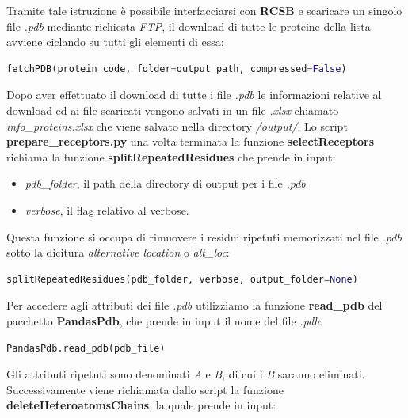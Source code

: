 Tramite tale istruzione è possibile interfacciarsi con \textbf{RCSB} e scaricare un singolo file \textit{.pdb} mediante richiesta \textit{FTP}, il download di tutte le proteine della lista avviene ciclando su tutti gli elementi di essa:

\begin{lstlisting}[language=Python, label=lst:code18, caption={funzione fetchPDB}]
fetchPDB(protein_code, folder=output_path, compressed=False)
\end{lstlisting}

Dopo aver effettuato il download di tutte i file \textit{.pdb} le informazioni relative al download ed ai file scaricati vengono salvati in un file \textit{.xlsx} chiamato \textit{info\_proteins.xlsx} che viene salvato nella directory \textit{/output/}.\newline
Lo script \textbf{prepare\_receptors.py} una volta terminata la funzione \textbf{selectReceptors} richiama la funzione \textbf{splitRepeatedResidues} che prende in input:

\begin{itemize}
    \item \textit{pdb\_folder}, il path della directory di output per i file \textit{.pdb}
    \item \textit{verbose}, il flag relativo al verbose.
\end{itemize}

Questa funzione si occupa di rimuovere i residui ripetuti memorizzati nel file \textit{.pdb} sotto la dicitura \textit{alternative location} o \textit{alt\_loc}:

\begin{lstlisting}[language=Python, label=lst:code19, caption={funzione splitRepeatedResidues}]
splitRepeatedResidues(pdb_folder, verbose, output_folder=None)    
\end{lstlisting}

Per accedere agli attributi dei file \textit{.pdb} utilizziamo la funzione \textbf{read\_pdb} del pacchetto \textbf{PandasPdb}, che prende in input il nome del file \textit{.pdb}:

\begin{lstlisting}[language=Python, label=lst:code20, caption={funzione PandasPdb.read\_pdb}]
PandasPdb.read_pdb(pdb_file)
\end{lstlisting}

Gli attributi ripetuti sono denominati \textit{A} e \textit{B}, di cui i \textit{B} saranno eliminati.\newline
Successivamente viene richiamata dallo script la funzione \textbf{deleteHeteroatomsChains}, la quale prende in input:

